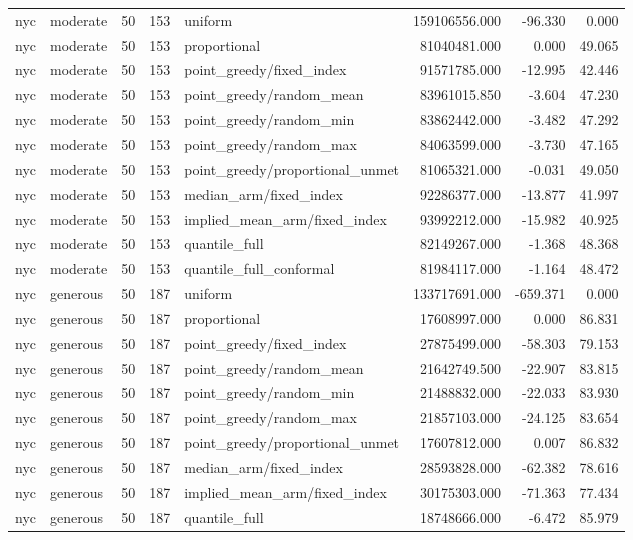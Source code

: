 \begin{tabular}{llrrlrrr}
nyc & moderate & 50 & 153 & uniform & 159106556.000 & -96.330 & 0.000 \\
nyc & moderate & 50 & 153 & proportional & 81040481.000 & 0.000 & 49.065 \\
nyc & moderate & 50 & 153 & point\_greedy/fixed\_index & 91571785.000 & -12.995 & 42.446 \\
nyc & moderate & 50 & 153 & point\_greedy/random\_mean & 83961015.850 & -3.604 & 47.230 \\
nyc & moderate & 50 & 153 & point\_greedy/random\_min & 83862442.000 & -3.482 & 47.292 \\
nyc & moderate & 50 & 153 & point\_greedy/random\_max & 84063599.000 & -3.730 & 47.165 \\
nyc & moderate & 50 & 153 & point\_greedy/proportional\_unmet & 81065321.000 & -0.031 & 49.050 \\
nyc & moderate & 50 & 153 & median\_arm/fixed\_index & 92286377.000 & -13.877 & 41.997 \\
nyc & moderate & 50 & 153 & implied\_mean\_arm/fixed\_index & 93992212.000 & -15.982 & 40.925 \\
nyc & moderate & 50 & 153 & quantile\_full & 82149267.000 & -1.368 & 48.368 \\
nyc & moderate & 50 & 153 & quantile\_full\_conformal & 81984117.000 & -1.164 & 48.472 \\
nyc & generous & 50 & 187 & uniform & 133717691.000 & -659.371 & 0.000 \\
nyc & generous & 50 & 187 & proportional & 17608997.000 & 0.000 & 86.831 \\
nyc & generous & 50 & 187 & point\_greedy/fixed\_index & 27875499.000 & -58.303 & 79.153 \\
nyc & generous & 50 & 187 & point\_greedy/random\_mean & 21642749.500 & -22.907 & 83.815 \\
nyc & generous & 50 & 187 & point\_greedy/random\_min & 21488832.000 & -22.033 & 83.930 \\
nyc & generous & 50 & 187 & point\_greedy/random\_max & 21857103.000 & -24.125 & 83.654 \\
nyc & generous & 50 & 187 & point\_greedy/proportional\_unmet & 17607812.000 & 0.007 & 86.832 \\
nyc & generous & 50 & 187 & median\_arm/fixed\_index & 28593828.000 & -62.382 & 78.616 \\
nyc & generous & 50 & 187 & implied\_mean\_arm/fixed\_index & 30175303.000 & -71.363 & 77.434 \\
nyc & generous & 50 & 187 & quantile\_full & 18748666.000 & -6.472 & 85.979 \\

\end{tabular}
